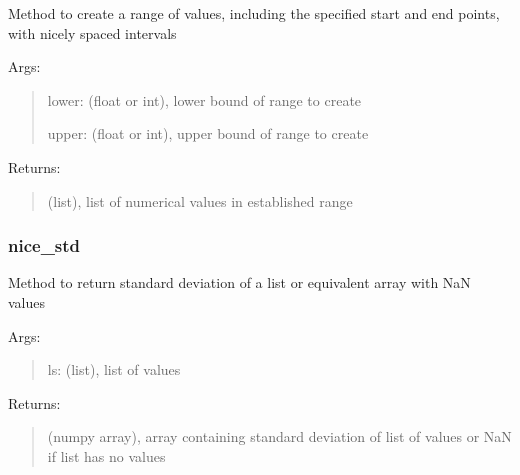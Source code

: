 \documentclass[letterpaper,10pt,english]{sphinxmanual}
\begin{document}
\begin{fulllineitems}
\label{\detokenize{api/mastml.plots.nice_range:mastml.plots.nice_range}}
Method to create a range of values, including the specified start and end points, with nicely spaced intervals

Args:
\begin{quote}

lower: (float or int), lower bound of range to create

upper: (float or int), upper bound of range to create
\end{quote}

Returns:
\begin{quote}

(list), list of numerical values in established range
\end{quote}

\end{fulllineitems}



\subsubsection{nice\_std}
\label{\detokenize{api/mastml.plots.nice_std:nice-std}}\label{\detokenize{api/mastml.plots.nice_std::doc}}

\begin{fulllineitems}
\label{\detokenize{api/mastml.plots.nice_std:mastml.plots.nice_std}}
Method to return standard deviation of a list or equivalent array with NaN values

Args:
\begin{quote}

ls: (list), list of values
\end{quote}

Returns:
\begin{quote}

(numpy array), array containing standard deviation of list of values or NaN if list has no values
\end{quote}

\end{fulllineitems}
\end{document}
